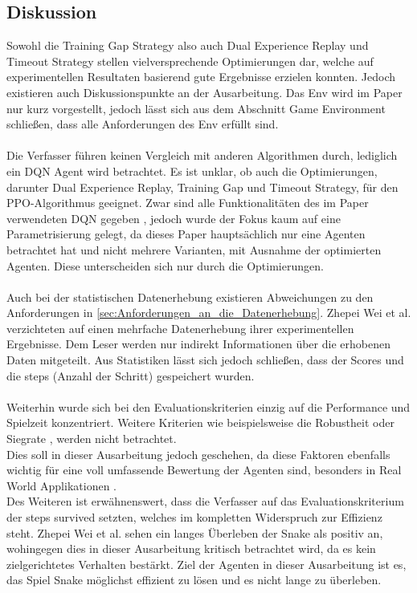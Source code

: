\subsection{Diskussion} \label{subsec:Verwandte_Arbeiten_Paper_1_Diskussion}
Sowohl die Training Gap Strategy also auch Dual Experience Replay und Timeout Strategy stellen vielversprechende Optimierungen dar, welche auf experimentellen Resultaten basierend gute Ergebnisse erzielen konnten. Jedoch existieren auch Diskussionspunkte an der Ausarbeitung.
Das Env wird im Paper nur kurz vorgestellt, jedoch lässt sich aus dem Abschnitt Game Environment schließen, dass alle Anforderungen des Env  erfüllt sind.\\
\\Die Verfasser führen keinen Vergleich mit anderen Algorithmen durch, lediglich ein DQN Agent wird betrachtet. 
Es ist unklar, ob auch die Optimierungen, darunter Dual Experience Replay, Training Gap und Timeout Strategy, für den PPO-Algorithmus geeignet.
Zwar sind alle Funktionalitäten des im Paper verwendeten DQN gegeben , jedoch wurde der Fokus kaum auf eine Parametrisierung  gelegt, da dieses Paper hauptsächlich nur eine Agenten betrachtet hat und nicht mehrere Varianten, mit Ausnahme der optimierten Agenten. Diese unterscheiden sich nur durch die Optimierungen.\\
\\Auch bei der statistischen Datenerhebung existieren Abweichungen zu den Anforderungen in \autoref{sec:Anforderungen_an_die_Datenerhebung}. Zhepei Wei et al. verzichteten auf einen mehrfache Datenerhebung ihrer experimentellen Ergebnisse. Dem Leser werden nur indirekt Informationen über die erhobenen Daten mitgeteilt. Aus Statistiken lässt sich jedoch schließen, dass der Scores und die steps (Anzahl der Schritt) gespeichert wurden.\\
\\Weiterhin wurde sich bei den Evaluationskriterien einzig auf die Performance und Spielzeit konzentriert. Weitere Kriterien wie beispielsweise die Robustheit oder Siegrate , werden nicht betrachtet.\\
Dies soll in dieser Ausarbeitung jedoch geschehen, da diese Faktoren ebenfalls wichtig für eine voll umfassende Bewertung der Agenten sind, besonders in Real World Applikationen .\\ 
Des Weiteren ist erwähnenswert, dass die Verfasser auf das Evaluationskriterium der steps survived setzten, welches im kompletten Widerspruch zur Effizienz  steht. Zhepei Wei et al. sehen ein langes Überleben der Snake als positiv an, wohingegen dies in dieser Ausarbeitung kritisch betrachtet wird, da es kein zielgerichtetes Verhalten bestärkt. Ziel der Agenten in dieser Ausarbeitung ist es, das Spiel Snake möglichst effizient zu lösen und es nicht lange zu überleben.

